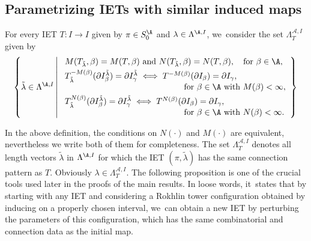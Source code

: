 \subsection{Parametrizing IETs with similar induced maps}
For every IET $T: I \to I$ given by $\pi \in S_0^\A$ and $\lambda\in\Lambda^{\A,I}$, we~consider the set $\Lambda^{\mathcal A,I}_T$ given by
\begin{equation}
\label{eq:nbhd_connections}
\left\{\tilde\lambda\in\Lambda^{\A,I} \left|\;
\begin{array}{l}
M(T_{\tilde{\lambda}},\beta)=M(T,\beta)\ \text{and}\ N(T_{\tilde{\lambda}},\beta)=N(T,\beta), \quad \text{for}\ \beta\in\A, \\[3pt]
T_{\tilde{\lambda}}^{-M(\beta)}(\partial I_\beta^{\tilde\lambda})=\partial I_\gamma^{\tilde\lambda}\iff T^{-M(\beta)}(\partial I_\beta)=\partial I_\gamma,\\
\hspace*{5cm} \text{for $\beta \in \A$ with }M(\beta)<\infty,\\[3pt]
T_{\tilde{\lambda}}^{N(\beta)}(\partial I_\beta^{\tilde\lambda})=\partial I_\gamma^{\tilde\lambda}\iff T^{N(\beta)}(\partial I_\beta)=\partial I_\gamma, \\
\hspace*{5cm}\text{for $\beta \in \A$ with }N(\beta)<\infty.
\end{array}\right\} \right.
\end{equation}

In the above definition, the conditions on $N(\cdot)$ and $M(\cdot)$ are equivalent, nevertheless we write both of them for completeness. The set $\Lambda^{\mathcal A,I}_T$ denotes all length vectors $\tilde \lambda$ in $\Lambda^{\A,I}$ for which the IET $(\pi, \tilde \lambda)$ has the same connection pattern as $T$. Obviously $\lambda\in \Lambda^{\mathcal A,I}_T$. The following proposition is one of the crucial tools used later in the proofs of the main results. In loose words, it~states that by starting with any IET and considering a Rokhlin tower configuration obtained by inducing on a properly chosen interval, we~can obtain a new IET by perturbing the parameters of this configuration, which has the same combinatorial and connection data as the initial map.

